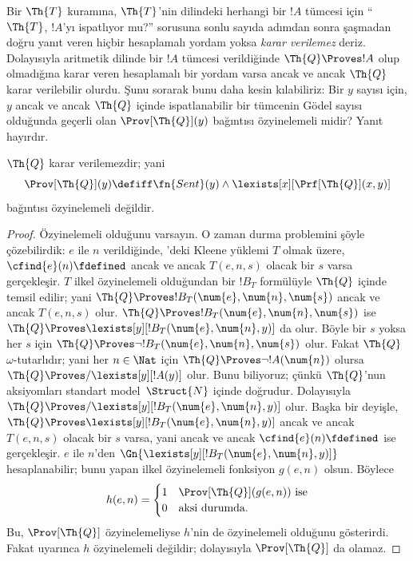 


Bir $\Th{T}$ kuramına, $\Th{T}$'nin dilindeki herhangi bir $!A$ tümcesi
için ``$\Th{T}$, $!A$'yı ispatlıyor mu?'' sorusuna sonlu sayıda adımdan
sonra şaşmadan doğru yanıt veren hiçbir hesaplamalı yordam yoksa
\emph{karar verilemez} deriz. Dolayısıyla aritmetik dilinde bir $!A$ tümcesi
verildiğinde $\Th{Q} \Proves !A$ olup olmadığına karar veren hesaplamalı
bir yordam varsa ancak ve ancak $\Th{Q}$ karar verilebilir olurdu. Şunu
sorarak bunu daha kesin kılabiliriz: Bir $y$ sayısı için, $y$ ancak ve ancak $\Th{Q}$ içinde
ispatlanabilir bir tümcenin Gödel sayısı olduğunda geçerli olan
$\Prov[\Th{Q}](y)$ bağıntısı özyinelemeli midir? Yanıt hayırdır.

\begin{thm}
$\Th{Q}$ karar verilemezdir; yani
\[
\Prov[\Th{Q}](y) \defiff \fn{Sent}(y) \land
\lexists[x][\Prf[\Th{Q}](x, y)]
\]
bağıntısı özyinelemeli değildir.
\end{thm}

\begin{proof}
Özyinelemeli olduğunu varsayın. O zaman durma problemini şöyle çözebilirdik:
$e$ ile $n$ verildiğinde, 'deki Kleene
yüklemi $T$ olmak üzere, $\cfind{e}(n)\fdefined$ ancak ve ancak
$T(e,n,s)$ olacak bir $s$ varsa gerçekleşir. $T$ ilkel özyinelemeli
olduğundan bir $!B_T$ formülüyle $\Th{Q}$ içinde temsil edilir; yani
$\Th{Q} \Proves !B_T(\num{e},\num{n},\num{s})$ ancak ve ancak $T(e,n,s)$
olur. $\Th{Q} \Proves !B_T(\num{e},\num{n},\num{s})$ ise
$\Th{Q} \Proves \lexists[y][!B_T(\num{e},\num{n},y)]$ da olur. Böyle bir
$s$ yoksa her $s$ için
$\Th{Q} \Proves \lnot !B_T(\num{e},\num{n},\num{s})$ olur. Fakat $\Th{Q}$
$\omega$-tutarlıdır; yani her $n\in\Nat$ için
$\Th{Q} \Proves \lnot !A(\num{n})$ olursa
$\Th{Q} \Proves/ \lexists[y][!A(y)]$ olur. Bunu biliyoruz; çünkü
$\Th{Q}$'nun aksiyomları standart model~$\Struct{N}$ içinde doğrudur.
Dolayısıyla $\Th{Q} \Proves/
\lexists[y][!B_T(\num{e},\num{n},y)]$ olur. Başka bir deyişle,
$\Th{Q} \Proves \lexists[y][!B_T(\num{e},\num{n},y)]$ ancak ve ancak
$T(e,n,s)$ olacak bir $s$ varsa, yani ancak ve ancak
$\cfind{e}(n)\fdefined$ ise gerçekleşir. $e$ ile $n$'den
$\Gn{\lexists[y][!B_T(\num{e},
    \num{n}, y)]}$ hesaplanabilir; bunu yapan ilkel özyinelemeli fonksiyon
$g(e,n)$ olsun. Böylece
\[
h(e, n) =
\begin{cases}
1 & \text{$\Prov[\Th{Q}](g(e, n))$ ise}\\
0 & \text{aksi durumda}.
\end{cases}
\]
Bu, $\Prov[\Th{Q}]$ özyinelemeliyse $h$'nin de özyinelemeli olduğunu
gösterirdi. Fakat  uyarınca $h$
özyinelemeli değildir; dolayısıyla $\Prov[\Th{Q}]$ da olamaz.
\end{proof}


